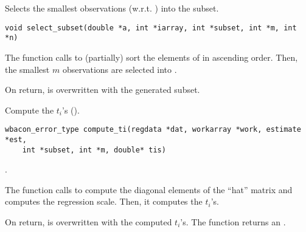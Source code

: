 \documentclass[a4paper,oneside,10pt,DIV=12]{scrreprt}
\begin{document}
\begin{Description}
Selects the smallest  observations (w.r.t. ) into the subset.
\end{Description}
\begin{Usage}
\begin{verbatim}
void select_subset(double *a, int *iarray, int *subset, int *m, int *n) 
\end{verbatim}
\end{Usage}
\begin{Arguments}
	\begin{ldescription}
		\SUBSET{}
		\SUBSETSIZEm
	\end{ldescription}
\end{Arguments}
\begin{Details}
The function calls  to (partially) sort
the elements of  in ascending order. Then, the smallest $m$ observations
are selected into .
\end{Details}
\begin{Value}
On return,  is overwritten with the generated subset.
\end{Value}

\begin{Description}
Compute the $t_i$'s (). 
\end{Description}
\begin{Usage}
\begin{verbatim}
wbacon_error_type compute_ti(regdata *dat, workarray *work, estimate *est, 
    int *subset, int *m, double* tis)
\end{verbatim}
\end{Usage}
\begin{Arguments}
	\begin{ldescription}
		\REGDATA
		\WORKreg
		\EST
		\SUBSET{}
		\SUBSETSIZEm
		\item[\code{tis}] \code{double array[n]}.	
	\end{ldescription}
\end{Arguments}
\begin{Details}
The function calls  to compute the diagonal
elements of the ``hat'' matrix and computes the regression scale. Then,
it computes the $t_i$'s.
\end{Details}
\begin{Value}
On return,  is overwritten with the computed $t_i$'s. The function
returns an .
\end{Value}
\end{document}
